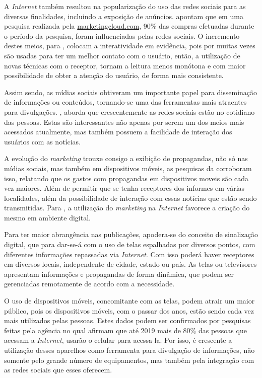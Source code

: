 A \textit{Internet} também resultou na popularização do uso das redes sociais para as diversas finalidades, incluindo a exposição de anúncios. \cite{seo2017} apontam que em uma pesquisa realizada pela \url{marketingcloud.com}, 90\% das compras efetuadas durante o período da pesquisa, foram influenciadas pelas redes sociais. O incremento destes meios, para \citet{escobar2007}, colocam a interatividade em evidência, pois por muitas vezes são usadas para ter um melhor contato com o usuário, então, a utilização de novas técnicas com o receptor, tornam a leitura menos monótona e com maior possibilidade de obter a atenção do usuário, de forma mais consistente.

Assim sendo, as mídias sociais obtiveram um importante papel para disseminação de informações ou conteúdos, tornando-se uma das ferramentas mais atraentes para divulgações. \citet{rosa2010}, aborda que crescentemente as redes sociais estão no cotidiano das pessoas. Estas são interessantes não apenas por serem um dos meios mais acessados atualmente, mas também possuem a facilidade de interação dos usuários com as notícias.


A evolução do \textit{marketing} trouxe consigo a exibição de propagandas, não só nas mídias sociais, mas também em dispositivos móveis, as pesquisas da \cite{emarketer2013} corroboram isso, relatando que os gastos com propagandas em dispositivos moveis são cada vez maiores. Além de permitir que se tenha receptores dos informes em várias localidades, além da possibilidade de interação com essas notícias que estão sendo transmitidas. Para \citet{santos2014}, a utilização do \textit{marketing} na \textit{Internet} favorece a criação do mesmo em ambiente digital.

Para ter maior abrangência nas publicações, apodera-se do conceito de sinalização digital, que para \citet{machado2010} dar-se-á com o uso de telas espalhadas por diversos pontos, com diferentes informações repassadas via \textit{Internet}. Com isso poderá haver receptores em diversos locais, independente de cidade, estado ou país. As telas ou televisores apresentam informações e propagandas de forma dinâmica, que podem ser gerenciadas remotamente de acordo com a necessidade. 

O uso de dispositivos móveis, concomitante com as telas, podem atrair um maior público, pois os dispositivos móveis, com o passar dos anos, estão sendo cada vez mais utilizados pelas pessoas. Estes dados podem ser confirmados por pesquisas feitas pela agência \cite{emarketer} no qual afirmam que até 2019 mais de 80\% das pessoas que acessam a \textit{Internet}, usarão o celular para acessa-la. Por isso, é crescente a utilização desses aparelhos como ferramenta para divulgação de informações, não somente pelo grande número de equipamentos, mas também pela integração com as redes sociais que esses oferecem. 


